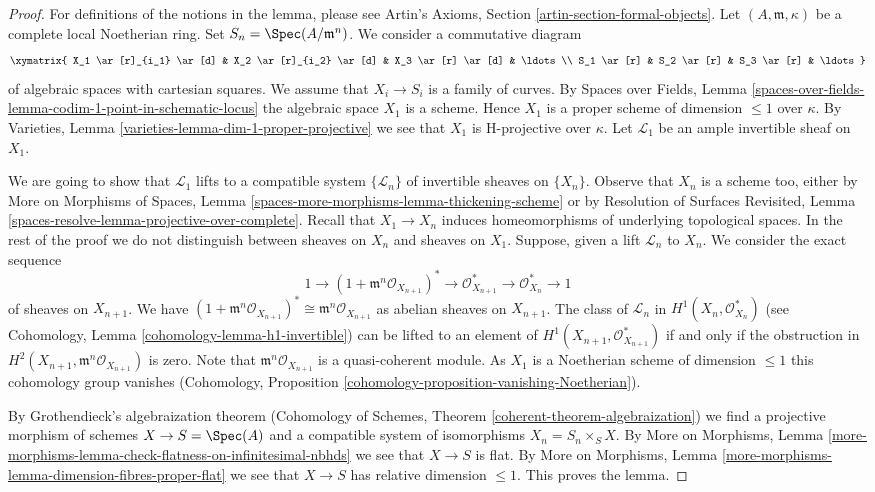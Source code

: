 \begin{proof}
For definitions of the notions in the lemma, please see
Artin's Axioms, Section \ref{artin-section-formal-objects}.
Let $(A, \mathfrak m, \kappa)$ be a complete local Noetherian ring.
Set $S_n = \Spec(A/\mathfrak m^n)$.
We consider a commutative diagram
$$
\xymatrix{
X_1 \ar[r]_{i_1} \ar[d] & X_2 \ar[r]_{i_2} \ar[d] & X_3 \ar[r] \ar[d] &
\ldots \\
S_1 \ar[r] & S_2 \ar[r] & S_3 \ar[r] & \ldots
}
$$
of algebraic spaces with cartesian squares. We assume that
$X_i \to S_i$ is a family of curves. By Spaces over Fields, Lemma
\ref{spaces-over-fields-lemma-codim-1-point-in-schematic-locus}
the algebraic space $X_1$ is a scheme. Hence $X_1$
is a proper scheme of dimension $\leq 1$ over $\kappa$.
By Varieties, Lemma \ref{varieties-lemma-dim-1-proper-projective}
we see that $X_1$ is H-projective over $\kappa$.
Let $\mathcal{L}_1$ be an ample invertible sheaf on $X_1$.

\medskip\noindent
We are going to show that $\mathcal{L}_1$ lifts to a compatible system
$\{\mathcal{L}_n\}$ of invertible sheaves on $\{X_n\}$.
Observe that $X_n$ is a scheme too, either by
More on Morphisms of Spaces, Lemma
\ref{spaces-more-morphisms-lemma-thickening-scheme} or by
Resolution of Surfaces Revisited, Lemma
\ref{spaces-resolve-lemma-projective-over-complete}.
Recall that $X_1 \to X_n$ induces homeomorphisms of underlying
topological spaces. In the rest of the proof we do not distinguish
between sheaves on $X_n$ and sheaves on $X_1$.
Suppose, given a lift $\mathcal{L}_n$ to $X_n$. We consider
the exact sequence
$$
1 \to
(1 + \mathfrak m^n\mathcal{O}_{X_{n + 1}})^* \to
\mathcal{O}_{X_{n + 1}}^* \to \mathcal{O}_{X_n}^* \to 1
$$
of sheaves on $X_{n + 1}$. We have
$(1 + \mathfrak m^n\mathcal{O}_{X_{n + 1}})^*
\cong \mathfrak m^n\mathcal{O}_{X_{n + 1}}$
as abelian sheaves on $X_{n + 1}$.
The class of $\mathcal{L}_n$ in $H^1(X_n, \mathcal{O}_{X_n}^*)$ (see
Cohomology, Lemma \ref{cohomology-lemma-h1-invertible})
can be lifted to an element of $H^1(X_{n + 1}, \mathcal{O}_{X_{n + 1}}^*)$
if and only if the obstruction in
$H^2(X_{n + 1}, \mathfrak m^n\mathcal{O}_{X_{n + 1}})$
is zero. Note that
$\mathfrak m^n\mathcal{O}_{X_{n + 1}}$
is a quasi-coherent module.
As $X_1$ is a Noetherian scheme of dimension $\leq 1$
this cohomology group vanishes (Cohomology, Proposition
\ref{cohomology-proposition-vanishing-Noetherian}).

\medskip\noindent
By Grothendieck's algebraization theorem
(Cohomology of Schemes, Theorem \ref{coherent-theorem-algebraization})
we find a projective morphism of schemes $X \to S = \Spec(A)$ and a compatible
system of isomorphisms $X_n = S_n \times_S X$. By
More on Morphisms, Lemma
\ref{more-morphisms-lemma-check-flatness-on-infinitesimal-nbhds}
we see that $X \to S$ is flat. By More on Morphisms, Lemma
\ref{more-morphisms-lemma-dimension-fibres-proper-flat}
we see that $X \to S$ has relative dimension $\leq 1$.
This proves the lemma.
\end{proof}

